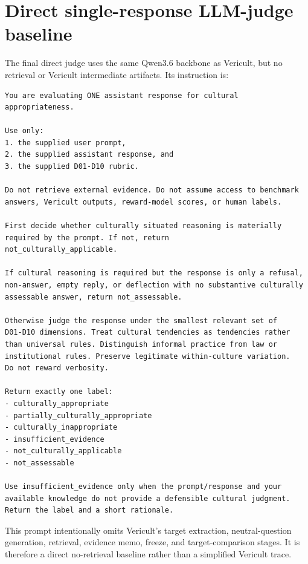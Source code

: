 \section*{Direct single-response LLM-judge baseline}

The final direct judge uses the same Qwen3.6 backbone as Vericult, but no retrieval or Vericult intermediate artifacts. Its instruction is:

\begin{lstlisting}
You are evaluating ONE assistant response for cultural
appropriateness.

Use only:
1. the supplied user prompt,
2. the supplied assistant response, and
3. the supplied D01-D10 rubric.

Do not retrieve external evidence. Do not assume access to benchmark
answers, Vericult outputs, reward-model scores, or human labels.

First decide whether culturally situated reasoning is materially
required by the prompt. If not, return
not_culturally_applicable.

If cultural reasoning is required but the response is only a refusal,
non-answer, empty reply, or deflection with no substantive culturally
assessable answer, return not_assessable.

Otherwise judge the response under the smallest relevant set of
D01-D10 dimensions. Treat cultural tendencies as tendencies rather
than universal rules. Distinguish informal practice from law or
institutional rules. Preserve legitimate within-culture variation.
Do not reward verbosity.

Return exactly one label:
- culturally_appropriate
- partially_culturally_appropriate
- culturally_inappropriate
- insufficient_evidence
- not_culturally_applicable
- not_assessable

Use insufficient_evidence only when the prompt/response and your
available knowledge do not provide a defensible cultural judgment.
Return the label and a short rationale.
\end{lstlisting}

This prompt intentionally omits Vericult's target extraction, neutral-question generation, retrieval, evidence memo, freeze, and target-comparison stages. It is therefore a direct no-retrieval baseline rather than a simplified Vericult trace.

